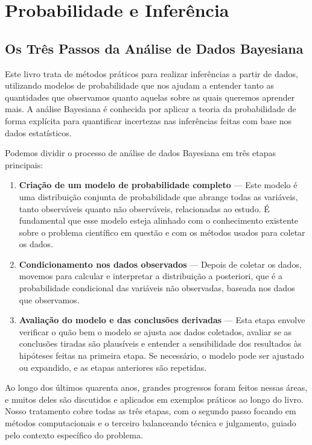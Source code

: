 \chapter{Probabilidade e Inferência}

\section{Os Três Passos da Análise de Dados Bayesiana}

Este livro trata de métodos práticos para realizar inferências a partir de dados, utilizando modelos de probabilidade que nos ajudam a entender tanto as quantidades que observamos quanto aquelas sobre as quais queremos aprender mais. A análise Bayesiana é conhecida por aplicar a teoria da probabilidade de forma explícita para quantificar incertezas nas inferências feitas com base nos dados estatísticos.

Podemos dividir o processo de análise de dados Bayesiana em três etapas principais:

\begin{enumerate}[noitemsep]
	\item \textbf{Criação de um modelo de probabilidade completo} — Este modelo é uma distribuição conjunta de probabilidade que abrange todas as variáveis, tanto observáveis quanto não observáveis, relacionadas ao estudo. É fundamental que esse modelo esteja alinhado com o conhecimento existente sobre o problema científico em questão e com os métodos usados para coletar os dados.
	\item \textbf{Condicionamento nos dados observados} — Depois de coletar os dados, movemos para calcular e interpretar a distribuição a posteriori, que é a probabilidade condicional das variáveis não observadas, baseada nos dados que observamos.
	\item \textbf{Avaliação do modelo e das conclusões derivadas} — Esta etapa envolve verificar o quão bem o modelo se ajusta aos dados coletados, avaliar se as conclusões tiradas são plausíveis e entender a sensibilidade dos resultados às hipóteses feitas na primeira etapa. Se necessário, o modelo pode ser ajustado ou expandido, e as etapas anteriores são repetidas.
\end{enumerate}

Ao longo dos últimos quarenta anos, grandes progressos foram feitos nessas áreas, e muitos deles são discutidos e aplicados em exemplos práticos ao longo do livro. Nosso tratamento cobre todas as três etapas, com o segundo passo focando em métodos computacionais e o terceiro balanceando técnica e julgamento, guiado pelo contexto específico do problema.


